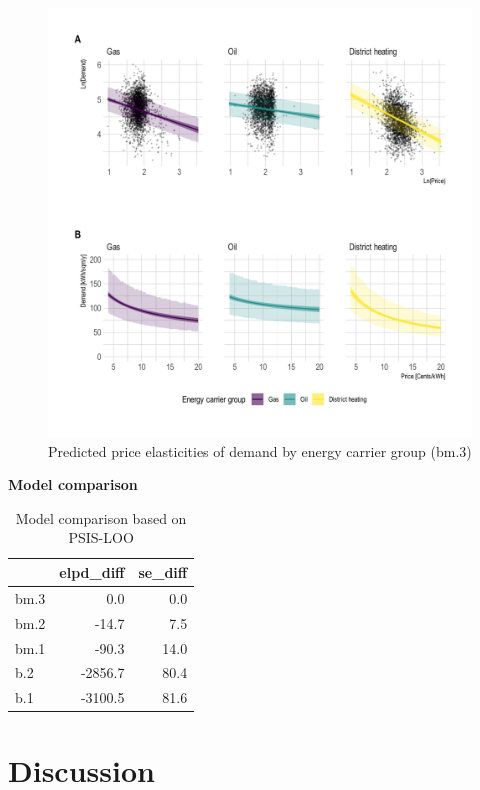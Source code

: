 \documentclass[12pt,twoside]{reedthesis}
\begin{document}
\begin{figure}

{\centering \includegraphics[width=1.04\linewidth]{figure/elasticity_predictions_subsample} 

}

\caption{Predicted price elasticities of demand by energy carrier group (bm.3)}\label{fig:elasticity-predictions-energy-carrier}
\end{figure}
\textbf{Model comparison}
\begin{table}[]
\centering
\caption{Model comparison based on PSIS-LOO}
\label{tab:model-comparison}
\begin{tabular}{@{}lrr@{}}
\toprule
     & \multicolumn{1}{l}{elpd\_diff} & \multicolumn{1}{l}{se\_diff} \\ \midrule
bm.3 & 0.0                            & 0.0                          \\
bm.2 & -14.7                          & 7.5                          \\
bm.1 & -90.3                          & 14.0                         \\
b.2  & -2856.7                        & 80.4                         \\
b.1  & -3100.5                        & 81.6                         \\ \bottomrule
\end{tabular}
\end{table}
\hypertarget{discussion}{%
\chapter{Discussion}\label{discussion}}
\end{document}
